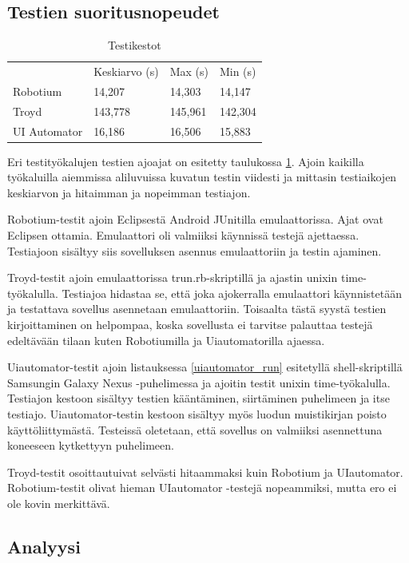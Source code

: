 \subsection{Testien suoritusnopeudet}

\begin{table}[h]
\centering
\begin{tabular}{ l l l l }
   & Keskiarvo (s) & Max (s) & Min (s) \\
  Robotium & 14,207 & 14,303 & 14,147 \\
  Troyd & 143,778 & 145,961 & 142,304 \\
  UI Automator & 16,186 & 16,506 & 15,883 \\
\end{tabular}
\caption{Testikestot}
\label{uitest_timing}
\end{table}

Eri testityökalujen testien ajoajat on esitetty taulukossa \ref{uitest_timing}. Ajoin kaikilla työkaluilla aiemmissa aliluvuissa kuvatun testin viidesti ja mittasin testiaikojen keskiarvon ja hitaimman ja nopeimman testiajon.

Robotium-testit ajoin Eclipsestä Android JUnitilla emulaattorissa. Ajat ovat Eclipsen ottamia. Emulaattori oli valmiiksi käynnissä testejä ajettaessa. Testiajoon sisältyy siis sovelluksen asennus emulaattoriin ja testin ajaminen.

Troyd-testit ajoin emulaattorissa trun.rb-skriptillä ja ajastin unixin time-työkalulla. Testiajoa hidastaa se, että joka ajokerralla emulaattori käynnistetään ja testattava sovellus asennetaan emulaattoriin. Toisaalta tästä syystä testien kirjoittaminen on helpompaa, koska sovellusta ei tarvitse palauttaa testejä edeltävään tilaan kuten Robotiumilla ja Uiautomatorilla ajaessa.

Uiautomator-testit ajoin listauksessa \ref{uiautomator_run} esitetyllä shell-skriptillä Samsungin Galaxy Nexus -puhelimessa ja ajoitin testit unixin time-työkalulla. Testiajon kestoon sisältyy testien kääntäminen, siirtäminen puhelimeen ja itse testiajo. Uiautomator-testin kestoon sisältyy myös luodun muistikirjan poisto käyttöliittymästä. Testeissä oletetaan, että sovellus on valmiiksi asennettuna koneeseen kytkettyyn puhelimeen.

Troyd-testit osoittautuivat selvästi hitaammaksi kuin Robotium ja UIautomator. Robotium-testit olivat hieman UIautomator -testejä nopeammiksi, mutta ero ei ole kovin merkittävä.

\subsection{Analyysi}

